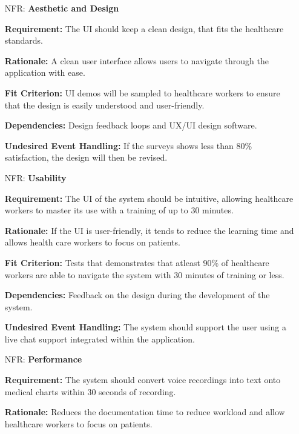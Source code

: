 \documentclass[12pt]{article}
\newcounter{nfrnum} %
\begin{document}
\noindent \begin{itemize}

\item[NFR\refstepcounter{nfrnum}\thenfrnum \label{NFR_LookAndFeel}:] \textbf{Aesthetic and Design}

    \textbf{Requirement:} The UI should keep a clean design, that fits the healthcare standards.

    \textbf{Rationale:} A clean user interface allows users to navigate through the application with ease.

    \textbf{Fit Criterion:} UI demos will be sampled to healthcare workers to ensure that the design is easily understood and user-friendly.

    \textbf{Dependencies:} Design feedback loops and UX/UI design software.  

    \textbf{Undesired Event Handling:} If the surveys shows less than 80\% satisfaction, the design will then be revised.


\item[NFR\refstepcounter{nfrnum}\thenfrnum \label{NFR_Usability}:] \textbf{Usability}

    \textbf{Requirement:} The UI of the system should be intuitive, allowing healthcare workers to master its use with a training of up to 30 minutes. 

    \textbf{Rationale:} If the UI is user-friendly, it tends to reduce the learning time and allows health care workers to focus on patients.
  

    \textbf{Fit Criterion:} Tests that demonstrates that atleast 90\% of healthcare workers are able to navigate the system with 30 minutes of training or less.

    \textbf{Dependencies:} Feedback on the design during the development of the system.

    \textbf{Undesired Event Handling:} The system should support the user using a live chat support integrated within the application.

\item[NFR\refstepcounter{nfrnum}\thenfrnum \label{NFR_Performance}:] \textbf{Performance}

    \textbf{Requirement:} The system should convert voice recordings into text onto medical charts within 30 seconds of recording.

    \textbf{Rationale:} Reduces the documentation time to reduce workload and allow healthcare workers to focus on patients.
    

\end{itemize}
\end{document}
